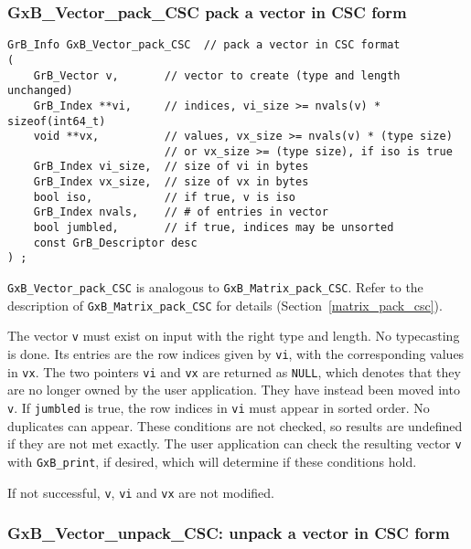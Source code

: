 \documentclass[12pt]{article}
\begin{document}
{\newpage
\subsubsection{{\sf GxB\_Vector\_pack\_CSC} pack a vector in CSC form}
\label{vector_pack_csc}

\begin{mdframed}[userdefinedwidth=6in]
{\footnotesize
\begin{verbatim}
GrB_Info GxB_Vector_pack_CSC  // pack a vector in CSC format
(
    GrB_Vector v,       // vector to create (type and length unchanged)
    GrB_Index **vi,     // indices, vi_size >= nvals(v) * sizeof(int64_t)
    void **vx,          // values, vx_size >= nvals(v) * (type size)
                        // or vx_size >= (type size), if iso is true
    GrB_Index vi_size,  // size of vi in bytes
    GrB_Index vx_size,  // size of vx in bytes
    bool iso,           // if true, v is iso
    GrB_Index nvals,    // # of entries in vector
    bool jumbled,       // if true, indices may be unsorted
    const GrB_Descriptor desc
) ;
\end{verbatim}
} \end{mdframed}

\noindent
\verb'GxB_Vector_pack_CSC' is analogous to \verb'GxB_Matrix_pack_CSC'.
Refer to the description of \verb'GxB_Matrix_pack_CSC' for details
(Section~\ref{matrix_pack_csc}).

The vector \verb'v' must
exist on input with the right type and length.  No typecasting is done.
Its entries are
the row indices given by \verb'vi', with the corresponding values in \verb'vx'.
The two pointers \verb'vi' and \verb'vx' are returned as \verb'NULL', which
denotes that they are no longer owned by the user application.  They have
instead been moved into \verb'v'.  If \verb'jumbled'
is true, the row indices in \verb'vi' must appear in sorted order.  No
duplicates can appear.  These conditions are not checked, so results are
undefined if they are not met exactly.  The user application can check the
resulting vector \verb'v' with \verb'GxB_print', if desired, which will
determine if these conditions hold.

If not successful, \verb'v', \verb'vi' and
\verb'vx' are not modified.

\newpage
\subsubsection{{\sf GxB\_Vector\_unpack\_CSC:} unpack a vector in CSC form}
\label{vector_unpack_csc}

}
\end{document}
